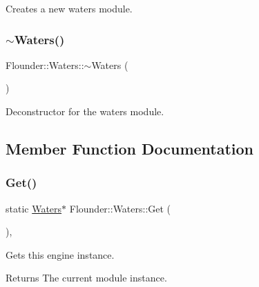 Creates a new waters module. 

\mbox{\label{class_flounder_1_1_waters_ab33b590a7bed98aa6921ddc117c59937}} 
\subsubsection{\texorpdfstring{$\sim$\+Waters()}{~Waters()}}
{\footnotesize\ttfamily Flounder\+::\+Waters\+::$\sim$\+Waters (\begin{DoxyParamCaption}{ }\end{DoxyParamCaption})}



Deconstructor for the waters module. 



\subsection{Member Function Documentation}
\mbox{\label{class_flounder_1_1_waters_af64e7fa0cd05d74e9d9309c3c46e2e65}} 
\subsubsection{\texorpdfstring{Get()}{Get()}}
{\footnotesize\ttfamily static \hyperlink{class_flounder_1_1_waters}{Waters}$\ast$ Flounder\+::\+Waters\+::\+Get (\begin{DoxyParamCaption}{ }\end{DoxyParamCaption})\hspace{0.3cm}{\ttfamily [inline]}, {\ttfamily [static]}}



Gets this engine instance. 

\begin{DoxyReturn}{Returns}
The current module instance. 
\end{DoxyReturn}
\mbox{\label{class_flounder_1_1_waters_a8f3801571babf43bce4960f7f61a94c4}} 
